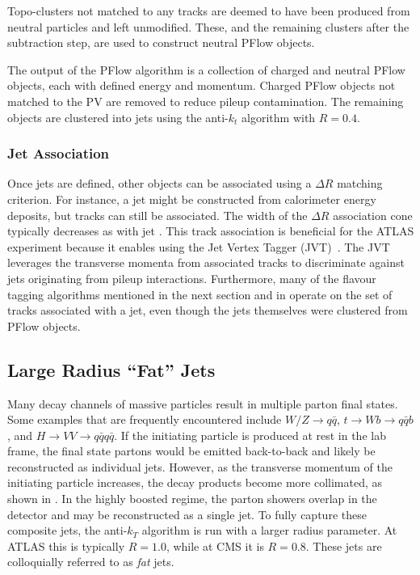 Topo-clusters not matched to any tracks are deemed to have been produced from neutral particles and left unmodified.
These, and the remaining clusters after the subtraction step, are used to construct neutral PFlow objects.

The output of the PFlow algorithm is a collection of charged and neutral PFlow objects, each with defined energy and momentum.
Charged PFlow objects not matched to the PV are removed to reduce pileup contamination.
The remaining objects are clustered into jets using the anti-$k_t$ algorithm with $R=0.4$.

\subsubsection{Jet Association}

Once jets are defined, other objects can be associated using a $\Delta R$ matching criterion.
For instance, a jet might be constructed from calorimeter energy deposits, but tracks can still be associated.
The width of the $\Delta R$ association cone typically decreases as with jet \pt.
This track association is beneficial for the ATLAS experiment because it enables using the Jet Vertex Tagger (JVT)~\cite{JVT}.
The JVT leverages the transverse momenta from associated tracks to discriminate against jets originating from pileup interactions.
Furthermore, many of the flavour tagging algorithms mentioned in the next section and in  operate on the set of tracks associated with a jet, even though the jets themselves were clustered from PFlow objects.

\subsection{Large Radius ``Fat'' Jets}
\label{sec:fat_jets}

Many decay channels of massive particles result in multiple parton final states.
Some examples that are frequently encountered include $W/Z \rightarrow q \bar{q}$, $t \rightarrow Wb \rightarrow q \bar{q} b$, and $H \rightarrow VV \rightarrow q \bar{q} q \bar{q}$.
If the initiating particle is produced at rest in the lab frame, the final state partons would be emitted back-to-back and likely be reconstructed as individual jets.
However, as the transverse momentum of the initiating particle increases, the decay products become more collimated, as shown in .
In the highly boosted regime, the parton showers overlap in the detector and may be reconstructed as a single jet.
To fully capture these composite jets, the anti-$k_T$ algorithm is run with a larger radius parameter.
At ATLAS this is typically $R=1.0$, while at CMS it is $R=0.8$.
These jets are colloquially referred to as \textit{fat} jets.

